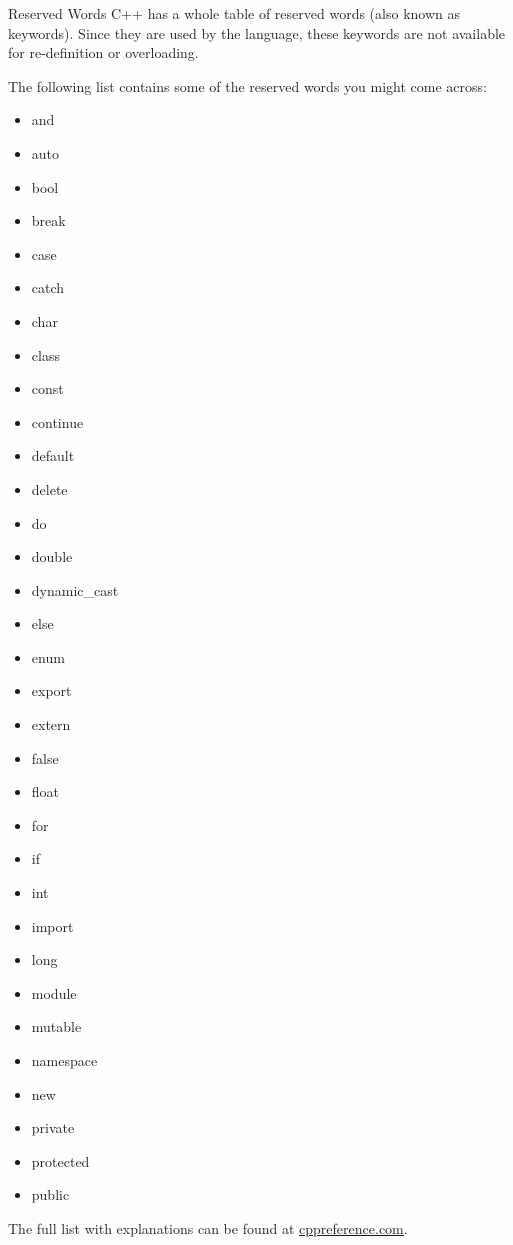 \documentclass[../lecture2-variables.tex]{subfiles}
\begin{document}
\begin{frame}[fragile]{Reserved Words}
    C++ has a whole table of reserved words (also known as keywords). \newline
    Since they are used by the language, these keywords are not available for
    re-definition or overloading. \newline \newline

    The following list contains some of the reserved words you might come across:
    \begin{itemize}
        \item and
        \item auto
        \item bool
        \item break
        \item case
        \item catch
        \item char
        \item class
        \item const
        \item continue
        \item default
        \item delete
        \item do
        \item double
        \item dynamic_cast
        \item else
        \item enum
        \item export
        \item extern
        \item false
        \item float
        \item for
        \item if
        \item int
        \item import
        \item long
        \item module
        \item mutable
        \item namespace
        \item new
        \item private
        \item protected
        \item public
    \end{itemize}
    The full list with explanations can be found at \href{http://en.cppreference.com/w/cpp/keyword}{cppreference.com}.
\end{frame}
\end{document}
